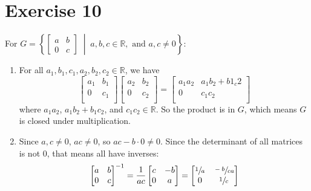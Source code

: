 \documentclass[12pt]{article}
\newcommand{\R}{\mathbb{R}}
\begin{document}
    \section*{Exercise 10}
    For $G = \left\{ \begin{bmatrix} a & b \\ 0 & c \end{bmatrix} \;
    \middle\vert \; a, b, c \in \R, \text{ and } a, c \neq 0 \right\}$:
    \begin{enumerate}[label=\textbf{\alph*.}]
        \item 
            For all $a_1, b_1, c_1, a_2, b_2, c_2 \in \R$, we have
            \[ \begin{bmatrix}
            a_1 & b_1 \\
            0 & c_1 \\
            \end{bmatrix}
            \begin{bmatrix}
            a_2 & b_2 \\
            0 & c_2 \\
            \end{bmatrix}
            = \begin{bmatrix}
            a_1a_2 & a_1b_2 + b1_c2 \\
            0 & c_1c_2 \\
            \end{bmatrix} \]
            where $a_1a_2$, $a_1b_2 + b_1c_2$, and $c_1c_2 \in \R$.
            So the product is in $G$,
            which means $G$ is closed under multiplication.
        \item
            Since $a, c \neq 0$, $ac \neq 0$,
            so $ac - b \cdot 0 \neq 0$.
            Since the determinant of all matrices is not 0, that means all
            have inverses:
            \[ \begin{bmatrix}
            a & b \\
            0 & c \\
            \end{bmatrix}^{-1}
            = \dfrac{1}{ac}\begin{bmatrix}
            c & -b \\
            0 & a \\
            \end{bmatrix}
            = \begin{bmatrix}
            \sfrac{1}{a} & \sfrac{-b}{ca} \\
            0 & \sfrac{1}{c} \\

\end{bmatrix}\]
\end{enumerate}
\end{document}
